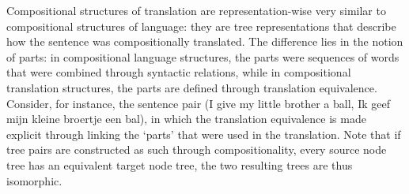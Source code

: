 \documentclass{report}
\theoremstyle{definition}
\theoremstyle{plain}
\begin{document}
Compositional structures of translation are representation-wise very similar to compositional structures of language: they are tree representations that describe how the sentence was compositionally translated. The difference lies in the notion of parts: in compositional language structures, the parts were sequences of words that were combined through syntactic relations, while in compositional translation structures, the parts are defined through translation equivalence. Consider, for instance, the sentence pair (I give my little brother a ball, Ik geef mijn kleine broertje een bal), in which the translation equivalence is made explicit through linking the `parts' that were used in the translation. Note that if tree pairs are constructed as such through compositionality, every source node tree has an equivalent target node tree, the two resulting trees are thus isomorphic.
\end{document}
